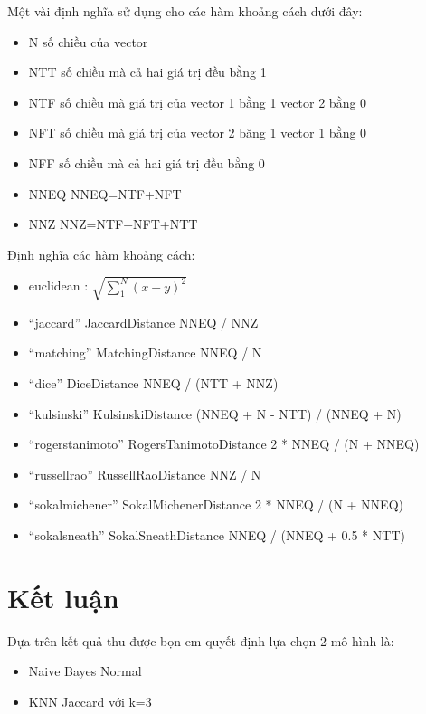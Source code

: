 \documentclass[a4paper,12pt]{report}
\begin{document}
Một vài định nghĩa sử dụng cho các hàm khoảng cách dưới đây:
\begin{itemize}
\item N số chiều của vector
\item NTT số chiều mà cả hai giá trị đều bằng 1
\item NTF số chiều mà giá trị của vector 1 bằng 1 vector 2 bằng 0
\item NFT số chiều mà giá trị của vector 2 băng 1 vector 1 bằng 0
\item NFF số chiều mà cả hai giá trị đều bằng 0
\item NNEQ NNEQ=NTF+NFT
\item NNZ NNZ=NTF+NFT+NTT 
\end{itemize}
Định nghĩa các hàm khoảng cách:
\begin{itemize}
\item euclidean : $\sqrt{\sum_1^N (x-y)^2}$
\item “jaccard”	JaccardDistance	NNEQ / NNZ
\item “matching”	MatchingDistance	NNEQ / N
\item “dice”	DiceDistance	NNEQ / (NTT + NNZ)
\item “kulsinski”	KulsinskiDistance	(NNEQ + N - NTT) / (NNEQ + N)\item “rogerstanimoto”	RogersTanimotoDistance	2 * NNEQ / (N + NNEQ)
\item “russellrao”	RussellRaoDistance	NNZ / N
\item “sokalmichener”	SokalMichenerDistance	2 * NNEQ / (N + NNEQ)
\item “sokalsneath”	SokalSneathDistance	NNEQ / (NNEQ + 0.5 * NTT)
\end{itemize}
\section{Kết luận}
Dựa trên kết quả thu được bọn em quyết định lựa chọn 2 mô hình là: 
\begin{itemize}
\item Naive Bayes Normal
\item KNN Jaccard với k=3
\end{itemize}
\begin{thebibliography}{9}


\end{thebibliography}
\end{document}
